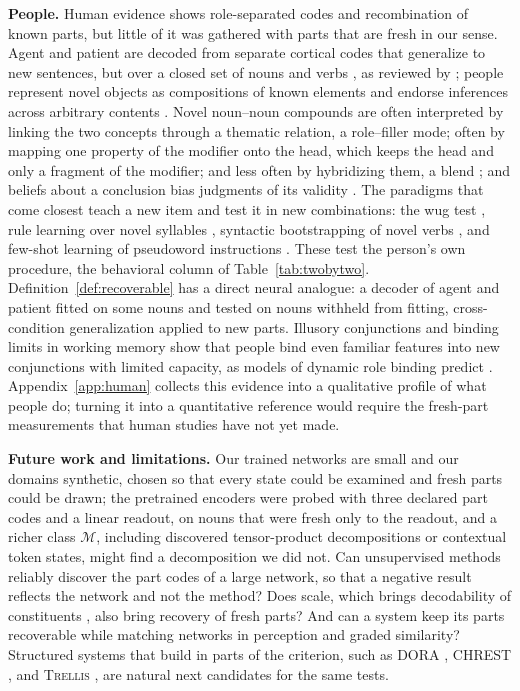 \documentclass[10pt]{article}
\theoremstyle{plain}
\theoremstyle{remark}
\newcommand{\M}{\mathcal{M}}
\begin{document}
\textbf{People.} Human evidence shows role-separated codes and recombination of known parts, but little of it was gathered with parts that are fresh in our sense. Agent and patient are decoded from separate cortical codes that generalize to new sentences, but over a closed set of nouns and verbs \citep{frankland2015}, as reviewed by \citet{frankland2020}; people represent novel objects as compositions of known elements \citep{schwartenbeck2023} and endorse inferences across arbitrary contents \citep{rips1994}. Novel noun--noun compounds are often interpreted by linking the two concepts through a thematic relation, a role--filler mode; often by mapping one property of the modifier onto the head, which keeps the head and only a fragment of the modifier; and less often by hybridizing them, a blend \citep{wisniewski1997}; and beliefs about a conclusion bias judgments of its validity \citep{evans1983}. The paradigms that come closest teach a new item and test it in new combinations: the wug test \citep{berko1958}, rule learning over novel syllables \citep{marcus1999}, syntactic bootstrapping of novel verbs \citep{gleitman1990,naigles1990}, and few-shot learning of pseudoword instructions \citep{lake2019}. These test the person's own procedure, the behavioral column of Table~\ref{tab:twobytwo}. Definition~\ref{def:recoverable} has a direct neural analogue: a decoder of agent and patient fitted on some nouns and tested on nouns withheld from fitting, cross-condition generalization \citep{bernardi2020} applied to new parts. Illusory conjunctions \citep{treisman1982} and binding limits in working memory \citep{wheeler2002} show that people bind even familiar features into new conjunctions with limited capacity, as models of dynamic role binding predict \citep{hummel1997}. Appendix~\ref{app:human} collects this evidence into a qualitative profile of what people do; turning it into a quantitative reference would require the fresh-part measurements that human studies have not yet made.

\textbf{Future work and limitations.} Our trained networks are small and our domains synthetic, chosen so that every state could be examined and fresh parts could be drawn; the pretrained encoders were probed with three declared part codes and a linear readout, on nouns that were fresh only to the readout, and a richer class $\M$, including discovered tensor-product decompositions \citep{soulos2020} or contextual token states, might find a decomposition we did not. Can unsupervised methods reliably discover the part codes of a large network, so that a negative result reflects the network and not the method? Does scale, which brings decodability of constituents \citep{redhardt2025}, also bring recovery of fresh parts? And can a system keep its parts recoverable while matching networks in perception and graded similarity? Structured systems that build in parts of the criterion, such as DORA \citep{doumas2022}, CHREST \citep{gobet2000}, and \textsc{Trellis} \citep{singaravadivelan2026}, are natural next candidates for the same tests.
\end{document}

